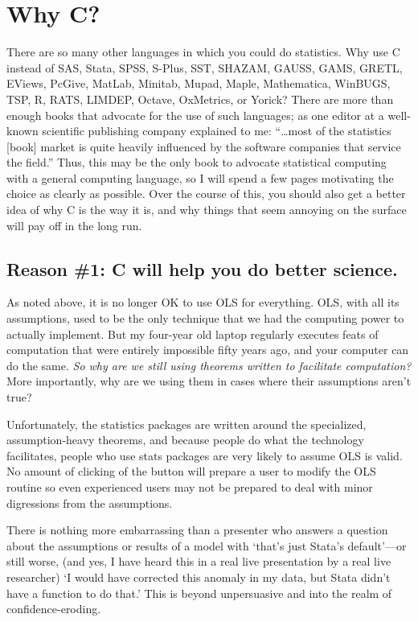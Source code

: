 \section{Why C?}

There are so many other languages in which you could do
statistics. Why use C instead of SAS, Stata, SPSS, S-Plus, SST, SHAZAM, GAUSS, GAMS, GRETL,
EViews, PcGive, MatLab, Minitab, Mupad, Maple, Mathematica, WinBUGS, TSP, R, RATS, LIMDEP, Octave, OxMetrics, or Yorick? 
There are more than enough books that advocate for the use of such
languages; 
as one editor at a well-known scientific publishing company
explained to me: ``\dots most of the statistics [book] market is quite heavily
influenced by the software companies that service the
field.''  Thus, this may be the only book to advocate statistical computing
with a general computing language, so I will spend a few pages motivating
the choice as clearly as possible. Over the course of this, you should
also get a better idea of why C is the way it is, and why things that
seem annoying on the surface will pay off in the long run.
\ifbook
\subsection{Reason \#1: C will help you do better science.}
As noted above, it is no longer OK to use OLS for everything.
OLS, with all its assumptions, used to be the only technique that we had the computing
power to actually implement. But my four-year old laptop regularly executes
feats of computation that were entirely impossible fifty years ago, and your
computer can do the same.  {\it So why are
we still using theorems written to facilitate computation?} More importantly, why
are we using them in cases where their assumptions aren't true?

Unfortunately, the statistics packages are written around the
specialized, assumption-heavy theorems, and because people do what the
technology facilitates, people who use stats packages are very
likely to assume OLS is valid. No amount of clicking of the
 button will prepare a user to modify the OLS routine so
even experienced users may not be prepared to deal with minor
digressions from the assumptions.

There is nothing more embarrassing than a presenter who answers a question
about the assumptions or results of a model with `that's just Stata's
default'---or still worse, (and yes, I have heard this in a real live
presentation by a real live researcher) `I would have corrected this
anomaly in my data, but Stata didn't have a function to do that.' This
is beyond unpersuasive and into the realm of confidence-eroding.

